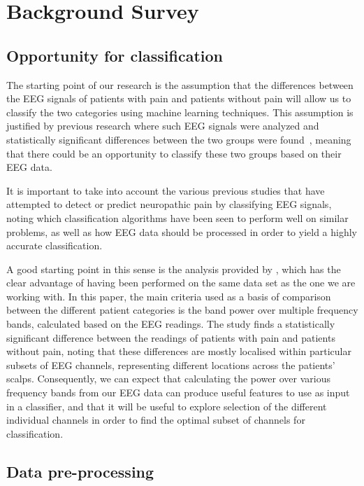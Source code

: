 \documentclass{mprop}
\begin{document}
\section{Background Survey}

\subsection{Opportunity for classification}

The starting point of our research is the assumption that the differences between the EEG signals of patients with pain and patients without pain will allow us to classify the two categories using machine learning techniques. This assumption is justified by previous research where such EEG signals were analyzed and statistically significant differences between the two groups were found~\cite{vuckovic_dynamic_2014,jarjees_causality_2017}, meaning that there could be an opportunity to classify these two groups based on their EEG data.

It is important to take into account the various previous studies that have attempted to detect or predict neuropathic pain by classifying EEG signals, noting which classification algorithms have been seen to perform well on similar problems, as well as how EEG data should be processed in order to yield a highly accurate classification.

A good starting point in this sense is the analysis provided by \citet{vuckovic_dynamic_2014}, which has the clear advantage of having been performed on the same data set as the one we are working with. In this paper, the main criteria used as a basis of comparison between the different patient categories is the band power over multiple frequency bands, calculated based on the EEG readings. The study finds a statistically significant difference between the readings of patients with pain and patients without pain, noting that these differences are mostly localised within particular subsets of EEG channels, representing different locations across the patients' scalps. Consequently, we can expect that calculating the power over various frequency bands from our EEG data can produce useful features to use as input in a classifier, and that it will be useful to explore selection of the different individual channels in order to find the optimal subset of channels for classification.

\subsection{Data pre-processing}
\label{data-prep}
\end{document}
